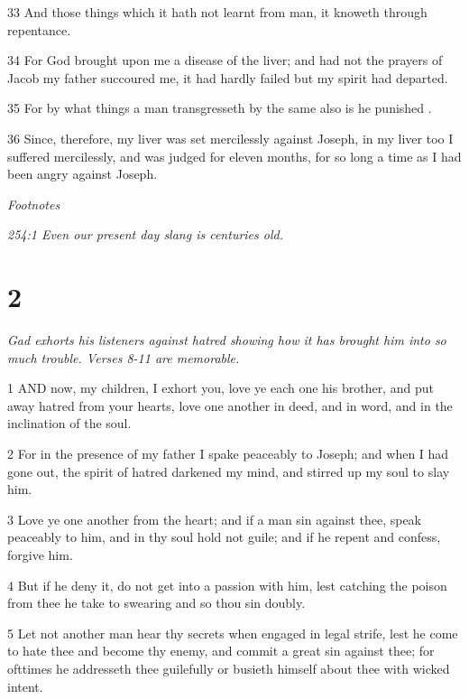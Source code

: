 \par 33 And those things which it hath not learnt from man, it knoweth through repentance.

\par 34 For God brought upon me a disease of the liver; and had not the prayers of Jacob my father succoured me, it had hardly failed but my spirit had departed.

\par 35 For by what things a man transgresseth by the same also is he punished .

\par 36 Since, therefore, my liver was set mercilessly against Joseph, in my liver too I suffered mercilessly, and was judged for eleven months, for so long a time as I had been angry against Joseph.

\par \textit{Footnotes}

\par \textit{254:1 Even our present day slang is centuries old.}

\chapter{2}

\par \textit{Gad exhorts his listeners against hatred showing how it has brought him into so much trouble. Verses 8-11 are memorable.}

\par 1 AND now, my children, I exhort you, love ye each one his brother, and put away hatred from your hearts, love one another in deed, and in word, and in the inclination of the soul.

\par 2 For in the presence of my father I spake peaceably to Joseph; and when I had gone out, the spirit of hatred darkened my mind, and stirred up my soul to slay him.

\par 3 Love ye one another from the heart; and if a man sin against thee, speak peaceably to him, and in thy soul hold not guile; and if he repent and confess, forgive him.

\par 4 But if he deny it, do not get into a passion with him, lest catching the poison from thee he take to swearing and so thou sin doubly.

\par 5 Let not another man hear thy secrets when engaged in legal strife, lest he come to hate thee and become thy enemy, and commit a great sin against thee; for ofttimes he addresseth thee guilefully or busieth himself about thee with wicked intent.

